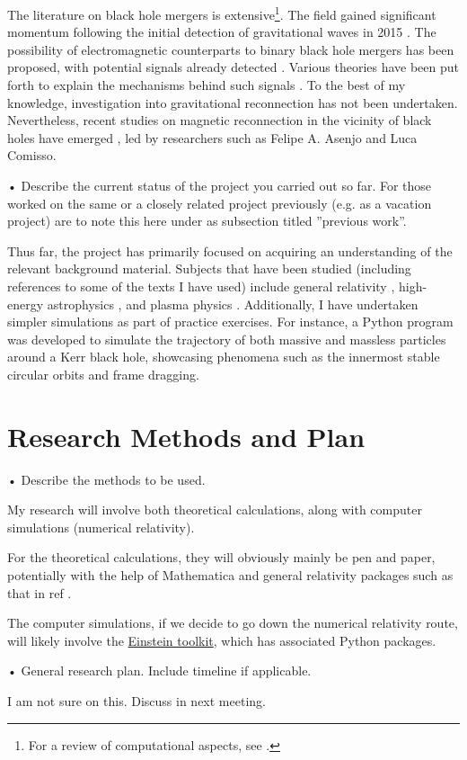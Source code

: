 The literature on black hole mergers is extensive\footnote{For a review of computational aspects, see \cite{RevModPhys.82.3069}.}. The field gained significant momentum following the initial detection of gravitational waves in 2015 \cite{abbott2016observation}. The possibility of electromagnetic counterparts to binary black hole mergers has been proposed, with potential signals already detected \cite{graham2020candidate}. Various theories have been put forth to explain the mechanisms behind such signals \cite{kelly2017prompt}. To the best of my knowledge, investigation into gravitational reconnection has not been undertaken. Nevertheless, recent studies on magnetic reconnection in the vicinity of black holes have emerged \cite{AsenjoFelipeA2017RMRi,comisso2021magnetic}, led by researchers such as Felipe A. Asenjo and Luca Comisso.

• Describe the current status of the project you carried out so far. For those worked on the same or a closely related project previously (e.g. as a vacation project) are to note this here under as subsection titled ”previous work”.

Thus far, the project has primarily focused on acquiring an understanding of the relevant background material. Subjects that have been studied (including references to some of the texts I have used) include general relativity \cite{hartle2003gravity,carroll2019spacetime}, high-energy astrophysics \cite{longair2010high}, and plasma physics \cite{choudhuri_1998}. Additionally, I have undertaken simpler simulations as part of practice exercises. For instance, a Python program was developed to simulate the trajectory of both massive and massless particles around a Kerr black hole, showcasing phenomena such as the innermost stable circular orbits and frame dragging.


\section{Research Methods and Plan}

• Describe the methods to be used.

My research will involve both theoretical calculations, along with computer simulations (numerical relativity). 

For the theoretical calculations, they will obviously mainly be pen and paper, potentially with the help of Mathematica and general relativity packages such as that in ref \cite{Shoshany2021_OGRe}.

The computer simulations, if we decide to go down the numerical relativity route, will likely involve the \href{http://einsteintoolkit.org/about.html}{Einstein toolkit}, which has associated Python packages.


• General research plan. Include timeline if applicable.

\danger I am not sure on this. Discuss in next meeting.






% 